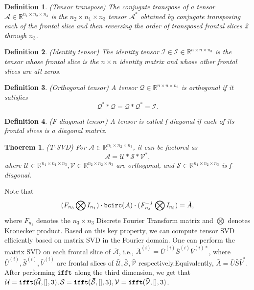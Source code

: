 \documentclass[journal,transmag]{IEEEtran}
\newtheorem{definition}{Definition}[section]
\newtheorem{theorem}{Thoerem}[section]
\theoremstyle{plain}
\begin{document}
\begin{definition} (Tensor transpose) The conjugate transpose of a tensor $\mathcal{A} \in \mathbb{R}^{n_1 \times n_2 \times n_3}$ is the $n_2 \times n_1 \times n_3$ tensor $\mathcal{A}^*$ obtained by conjugate transposing each of the frontal slice and then reversing the order of transposed frontal slices 2 through $n_3$.
\end{definition}

\begin{definition} (Identity tensor) The identity tensor $\mathcal{I} \in\mathcal{I}\in \mathbb{R}^{n\times n \times n_3}$ is the tensor whose frontal slice is the $n\times n$ identity matrix and whose other frontal slices are all zeros.
\end{definition}

\begin{definition} (Orthogonal tensor) A tensor $\mathcal{Q}\in \mathbb{R}^{n\times n\times n_3}$ is orthogonal if it satisfies
\begin{equation}
\mathcal{Q}^* * \mathcal{Q} =\mathcal{Q} * \mathcal{Q}^* = \mathcal{I}.
\end{equation}
\end{definition}

\begin{definition} (F-diagonal tensor) A tensor is called f-diagonal if each of its frontal slices is a diagonal matrix.
\end{definition}

\begin{theorem} (T-SVD) For $\mathcal{A}\in \mathbb{R}^{n_1 \times n_2 \times n_3}$, it can be factored as
\begin{equation}
\mathcal{A}=\mathcal{U}*\mathcal{S}*\mathcal{V}^*,
\end{equation}
where $\mathcal{U}\in\mathbb{R}^{n_1\times n_1\times n_3},\mathcal{V}\in \mathbb{R}^{n_2\times n_2\times n_3}$ are orthogonal, and $\mathcal{S}\in \mathbb{R}^{n_1\times n_2\times n_3}$ is f-diagonal.
\end{theorem}
Note that
\begin{equation}
(F_{n_3} \bigotimes I_{n_1} )\cdot \tt{bcirc}\it(\mathcal{A})\cdot (F^{-1}_{n_3}\bigotimes I_{n_2})=\bar{A},
\end{equation}
where $F_{n_3}$ denotes the $n_3\times n_3$ Discrete Fourier Transform matrix and $\bigotimes$ denotes Kronecker product. Based on this key property, we can compute tensor SVD efficiently based on matrix SVD in the Fourier domain. One can perform the matrix SVD on each frontal slice of $\bar{\mathcal{A}}$, i.e., $\bar{A}^{(i)}=\bar{U}^{(i)}\bar{S}^{(i)}\bar{V}^{(i)*}$, where $\bar{U}^{(i)},\bar{S}^{(i)},\bar{V}^{(i)}$ are frontal slices of $\bar{\mathcal{U}},\bar{\mathcal{S}},\bar{\mathcal{V}}$ respectively.Equivalently, $\bar{A}=\bar{U}\bar{S}\bar{V}^*$. After performing $\tt{ifft}$ along the third dimension, we get that $\mathcal{U}=\tt{ifft}(\bar{\mathcal{U}},[],3),\mathcal{S}=\tt{ifft}(\bar{\mathcal{S}},[],3),\mathcal{V}=\tt{ifft}(\bar{\mathcal{V}},[],3)$.
\end{document}
